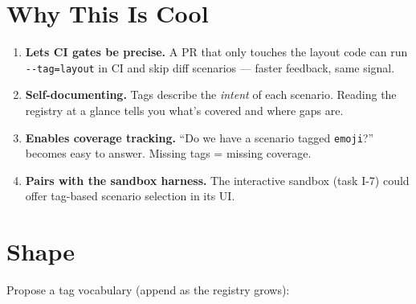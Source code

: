 \section{Why This Is Cool}\label{record-323-why-this-is-cool}

\begin{enumerate}
\def\labelenumi{\arabic{enumi}.}
\tightlist
\item
  \textbf{Lets CI gates be precise.} A PR that only touches the layout code can run \texttt{-\allowbreak{}-\allowbreak{}t\allowbreak{}a\allowbreak{}g\allowbreak{}=\allowbreak{}l\allowbreak{}a\allowbreak{}y\allowbreak{}o\allowbreak{}u\allowbreak{}t} in CI and skip diff scenarios --- faster feedback, same signal.
\item
  \textbf{Self-documenting.} Tags describe the \emph{intent} of each scenario. Reading the registry at a glance tells you what's covered and where gaps are.
\item
  \textbf{Enables coverage tracking.} ``Do we have a scenario tagged \texttt{e\allowbreak{}m\allowbreak{}o\allowbreak{}j\allowbreak{}i}?'' becomes easy to answer. Missing tags = missing coverage.
\item
  \textbf{Pairs with the sandbox harness.} The interactive sandbox (task I-7) could offer tag-based scenario selection in its UI.
\end{enumerate}

\section{Shape}\label{record-323-shape}

Propose a tag vocabulary (append as the registry grows):

